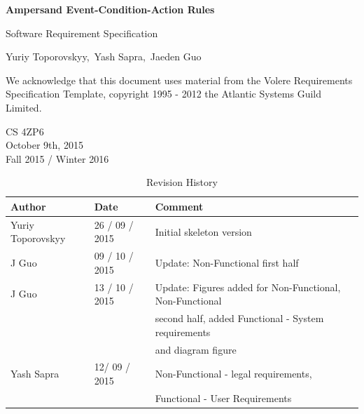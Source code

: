 \documentclass[12pt]{report}
\begin{document}
\begin{titlepage}\begin{center}
\thispagestyle{empty} %

\vspace*{1cm}

{\Huge\textbf{Ampersand Event-Condition-Action Rules}}

\vspace{0.5cm}
{\Large Software Requirement Specification 
	

\vspace{1.5cm}
Yuriy Toporovskyy,\ Yash Sapra,\ Jaeden Guo}
\vfill

We acknowledge that this document uses material from the Volere Requirements
Specification Template, copyright 1995 - 2012 the Atlantic Systems Guild
Limited.

\vspace{0.8cm}
\end{center}
CS 4ZP6 \\
October 9th, 2015 \\ 
Fall 2015 / Winter 2016 
\end{titlepage}


\begin{table}[ht!]\begin{center}
\caption{Revision History}  
\begin{tabular}{|l|l|l|}\hline
\textbf{Author} & \textbf{Date} & \textbf{Comment} \\\hline 
Yuriy Toporovskyy & 26 / 09 / 2015 & Initial skeleton version \\\hline
J Guo & 09 / 10 / 2015 & Update: Non-Functional first half \\\hline
J Guo & 13 / 10 / 2015 & Update: Figures added for Non-Functional, Non-Functional \\ & & second 
half, added Functional - System requirements  \\ & & and diagram figure \\\hline
Yash Sapra &  12/ 09 / 2015 & Non-Functional - legal requirements, \\ & & Functional - User 
Requirements 
\\\hline
\end{tabular}
\end{center}\end{table}
\end{document}
